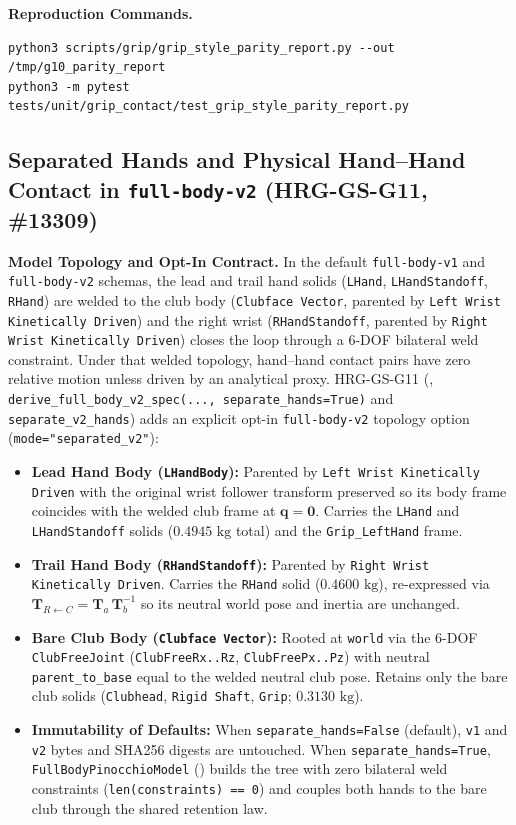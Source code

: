 \documentclass[11pt,a4paper]{article}
\begin{document}
\textbf{Reproduction Commands.}
\begin{verbatim}
python3 scripts/grip/grip_style_parity_report.py --out /tmp/g10_parity_report
python3 -m pytest tests/unit/grip_contact/test_grip_style_parity_report.py
\end{verbatim}

\subsection{Separated Hands and Physical Hand--Hand Contact in \texttt{full-body-v2} (HRG-GS-G11, \#13309)}
\textbf{Model Topology and Opt-In Contract.} In the default \texttt{full-body-v1} and \texttt{full-body-v2} schemas, the lead and trail hand solids (\texttt{LHand}, \texttt{LHandStandoff}, \texttt{RHand}) are welded to the club body (\texttt{Clubface Vector}, parented by \texttt{Left Wrist Kinetically Driven}) and the right wrist (\texttt{RHandStandoff}, parented by \texttt{Right Wrist Kinetically Driven}) closes the loop through a 6-DOF bilateral weld constraint. Under that welded topology, hand--hand contact pairs have zero relative motion unless driven by an analytical proxy. HRG-GS-G11 (, \texttt{derive\_full\_body\_v2\_spec(..., separate\_hands=True)} and \texttt{separate\_v2\_hands}) adds an explicit opt-in \texttt{full-body-v2} topology option (\texttt{mode="separated\_v2"}):
\begin{itemize}[leftmargin=*,noitemsep]
\item \textbf{Lead Hand Body (\texttt{LHandBody}):} Parented by \texttt{Left Wrist Kinetically Driven} with the original wrist follower transform preserved so its body frame coincides with the welded club frame at $\mathbf{q} = \mathbf{0}$. Carries the \texttt{LHand} and \texttt{LHandStandoff} solids ($0.4945\text{ kg}$ total) and the \texttt{Grip\_LeftHand} frame.
\item \textbf{Trail Hand Body (\texttt{RHandStandoff}):} Parented by \texttt{Right Wrist Kinetically Driven}. Carries the \texttt{RHand} solid ($0.4600\text{ kg}$), re-expressed via $\mathbf{T}_{R \leftarrow C} = \mathbf{T}_{a}\,\mathbf{T}_{b}^{-1}$ so its neutral world pose and inertia are unchanged.
\item \textbf{Bare Club Body (\texttt{Clubface Vector}):} Rooted at \texttt{world} via the 6-DOF \texttt{ClubFreeJoint} (\texttt{ClubFreeRx..Rz}, \texttt{ClubFreePx..Pz}) with neutral \texttt{parent\_to\_base} equal to the welded neutral club pose. Retains only the bare club solids (\texttt{Clubhead}, \texttt{Rigid Shaft}, \texttt{Grip}; $0.3130\text{ kg}$).
\item \textbf{Immutability of Defaults:} When \texttt{separate\_hands=False} (default), \texttt{v1} and \texttt{v2} bytes and SHA256 digests are untouched. When \texttt{separate\_hands=True}, \texttt{FullBodyPinocchioModel} () builds the tree with zero bilateral weld constraints (\texttt{len(constraints) == 0}) and couples both hands to the bare club through the shared retention law.
\end{itemize}
\end{document}
